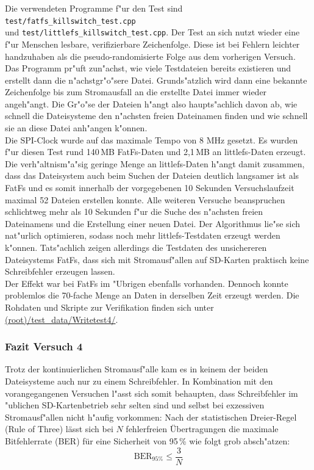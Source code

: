 \documentclass[11pt]{article}
\begin{document}
Die verwendeten Programme f"ur den Test sind \texttt{test/fatfs\_killswitch\_test.cpp} \\
und \texttt{test/littlefs\_killswitch\_test.cpp}. Der Test an sich nutzt wieder eine f"ur
Menschen lesbare, verifizierbare Zeichenfolge. Diese ist bei Fehlern leichter handzuhaben als die
pseudo-randomisierte Folge aus dem vorherigen Versuch. 
Das Programm pr"uft zun"achst, wie viele Testdateien bereits existieren und erstellt
dann die n"achstgr"o"sere Datei.
Grunds"atzlich wird dann eine bekannte Zeichenfolge
bis zum Stromausfall an die erstellte Datei immer wieder angeh"angt.
Die Gr"o"se der Dateien h"angt also haupts"achlich davon ab, wie schnell die
Dateisysteme den n"achsten freien Dateinamen finden und wie schnell sie an
diese Datei anh"angen k"onnen.\\
Die SPI-Clock wurde auf das maximale Tempo von 8 MHz gesetzt.
Es wurden f"ur diesen Test rund 140\,MB FatFs-Daten und 2,1\,MB an littlefs-Daten erzeugt.
Die verh"altnism"a"sig geringe Menge an littlefs-Daten h"angt damit zusammen,
dass das Dateisystem auch beim Suchen der Dateien deutlich langsamer ist als FatFs und es somit
innerhalb der vorgegebenen 10 Sekunden Versuchslaufzeit maximal 52 Dateien erstellen konnte.
Alle weiteren Versuche beanspruchen schlichtweg mehr als 10 Sekunden f"ur die Suche des n"achsten
freien Dateinamens und die Erstellung einer neuen Datei. Der Algorithmus lie"se sich nat"urlich
optimieren, sodass noch mehr littlefs-Testdaten erzeugt werden k"onnen. Tats"achlich zeigen allerdings
die Testdaten des unsichereren Dateisystems FatFs, dass sich mit Stromausf"allen auf SD-Karten 
praktisch keine Schreibfehler erzeugen lassen. \\
Der Effekt war bei FatFs im "Ubrigen ebenfalls vorhanden.
Dennoch konnte problemlos die 70-fache Menge an Daten in derselben Zeit erzeugt werden. 
Die Rohdaten und Skripte zur Verifikation finden sich unter 
\href{https://github.com/miko8278/stm32-SPI-SD-card/tree/main/test\_data/Writetest4/}{(root)/test\_data/Writetest4/}.

\subsubsection*{Fazit Versuch 4}
Trotz der kontinuierlichen Stromausf"alle kam es in keinem der beiden Dateisysteme auch nur zu einem Schreibfehler.
In Kombination mit den vorangegangenen Versuchen l"asst sich somit behaupten,
dass Schreibfehler im "ublichen SD-Kartenbetrieb sehr selten sind und selbst bei exzessiven Stromausf"allen
nicht h"aufig vorkommen:
Nach der statistischen Dreier-Regel (Rule of Three) lässt sich 
bei $N$ fehlerfreien Übertragungen die maximale Bitfehlerrate (BER) 
für eine Sicherheit von 95\,\% wie folgt grob absch"atzen:
$$
\text{BER}_{95\%} \le \frac{3}{N}
$$
\end{document}
